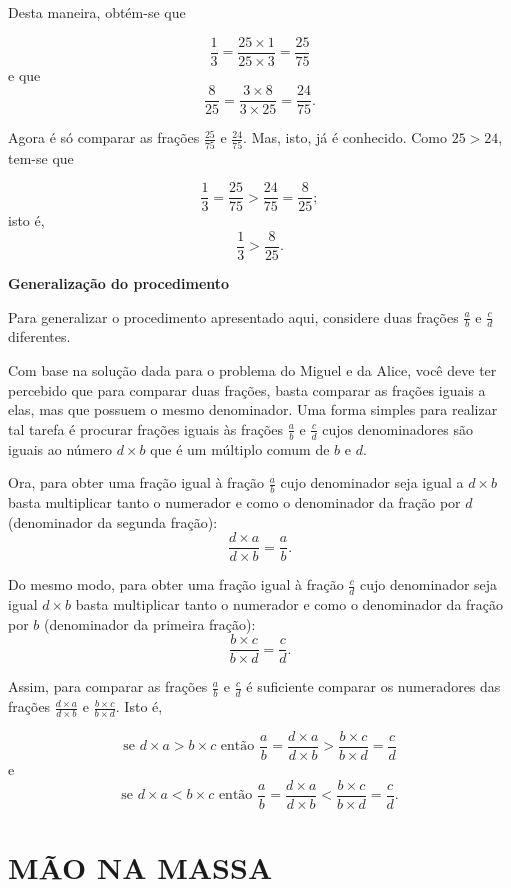 \documentclass[a4,12pt]{book}
\begin{document}
Desta maneira, obtém-se que

$$\dfrac{1}{3} = \dfrac{25 \times 1}{25 \times 3} = \dfrac{25}{75}$$
e que 
$$\dfrac{8}{25} = \dfrac{3 \times 8}{3 \times 25} = \dfrac{24}{75}.$$ 

Agora é só comparar as frações $\frac{25}{75}$ e $\frac{24}{75}$. Mas, isto, já é conhecido.
Como $25 > 24$, tem-se que 

$$\dfrac{1}{3} = \dfrac{25}{75} > \dfrac{24}{75} =  \dfrac{8}{25};$$
isto é, 
$$\dfrac{1}{3} > \dfrac{8}{25}.$$

{\bf Generalização do procedimento}

Para generalizar o procedimento apresentado aqui, considere duas frações $\frac{a}{b}$ e $\frac{c}{d}$ diferentes.

Com base na solução dada para o problema do Miguel e da Alice, você deve ter percebido que para comparar duas frações, basta comparar as frações iguais a elas, mas que possuem o mesmo denominador. Uma forma simples para realizar tal tarefa é procurar frações iguais às frações  $\frac{a}{b}$ e $\frac{c}{d}$ cujos denominadores são iguais ao número $d\times b$ que é um múltiplo comum de $b$ e $d$.

Ora, para obter uma fração igual à fração $\frac{a}{b}$ cujo denominador seja igual a $d\times b$ basta multiplicar tanto o numerador e como o denominador da fração por $d$ (denominador da segunda fração):
$$\dfrac{d\times a}{d \times b} =  \dfrac{a}{b}.$$

Do mesmo modo, para obter uma fração igual à fração $\frac{c}{d}$ cujo denominador seja igual $d\times b$ basta multiplicar tanto o numerador e como o denominador da fração por $b$ (denominador da primeira fração):
$$\dfrac{b\times c}{b \times d} =  \dfrac{c}{d}.$$

Assim, para comparar as frações $\frac{a}{b}$ e $\frac{c}{d}$ é suficiente comparar os numeradores das frações  $\frac{d\times a}{d \times b}$ e $\frac{b\times c}{b \times d}$.
Isto é, 

$$\text{se } d\times a > b\times c \text{ então }  \dfrac{a}{b} = \dfrac{d\times a}{d \times b} >\dfrac{b\times c}{b \times d} =  \dfrac{c}{d}$$
e
$$\text{se } d\times a < b\times c \text{ então }  \dfrac{a}{b} = \dfrac{d\times a}{d \times b} < \dfrac{b\times c}{b \times d} =  \dfrac{c}{d}.$$


\section{MÃO NA MASSA }
\end{document}

